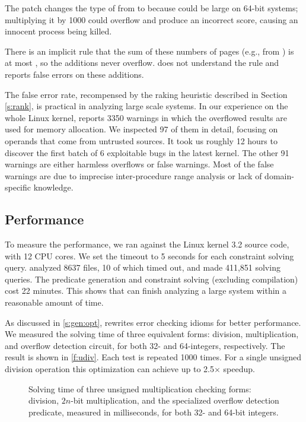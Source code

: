 The patch changes the type of  from  to  because
 could be large on 64-bit systems; multiplying it by
1000 could overflow and produce an incorrect score,
causing an innocent process being killed.

There is an implicit rule that the sum of these numbers of pages
(e.g., from ) is at most , so the
additions never overflow.  \sys does not understand the rule and
reports false errors on these additions.

The false error rate, recompensed by the raking heuristic described in Section
\ref{s:rank}, is practical in analyzing large scale systems. In our experience
on the whole Linux kernel, \sys reports 3350 warnings in which the overflowed
results are used for memory allocation. We inspected 97 of them in detail,
focusing on operands that come from untrusted sources. It took us roughly 12
hours to discover the first batch of 6 exploitable bugs in the latest kernel.
The other 91 warnings are either harmless overflows or false warnings.
Most of the false warnings are due to imprecise inter-procedure range analysis
or lack of domain-specific knowledge.


\subsection{Performance}
\label{s:eval:perf}

To measure the performance, we ran \sys against the Linux kernel
3.2 source code, with 12 CPU cores.  We set the timeout
to 5 seconds for each constraint solving query.   \sys analyzed
8637 files, 10 of which timed out, and made 411,851 solving queries.
The predicate generation and constraint solving (excluding compilation)
cost 22 minutes.  This shows that \sys can finish analyzing a large
system within a reasonable amount of time.

As discussed in \autoref{s:gen:opt}, \sys rewrites error checking
idioms for better performance.  We measured the solving time of three
equivalent forms: division, multiplication, and overflow detection
circuit, for both 32- and 64-integers, respectively.  The result
is shown in \autoref{f:udiv}.  Each test is repeated 1000 times.
For a single unsigned division operation this optimization can
achieve up to 2.5$\times$ speedup.

\begin{figure}
\centering

\caption{Solving time of three unsigned multiplication checking forms:
division, $2n$-bit multiplication, and the specialized overflow
detection predicate, measured in milliseconds, for both 32- and 64-bit
integers.}
\label{f:udiv}
\end{figure}
